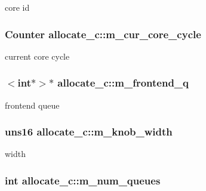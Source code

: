 \label{classallocate__c_a15027f8e994b1f1a92ced957c0e0d3a0}
core id \hypertarget{classallocate__c_af3cea72a28891dbd8f73705382225902}{
\subsubsection[{m\_\-cur\_\-core\_\-cycle}]{\setlength{\rightskip}{0pt plus 5cm}Counter {\bf allocate\_\-c::m\_\-cur\_\-core\_\-cycle}}}
\label{classallocate__c_af3cea72a28891dbd8f73705382225902}
current core cycle \hypertarget{classallocate__c_aff86488af7f8c8c0b95362604f0bf2dd}{
\subsubsection[{m\_\-frontend\_\-q}]{$<$int$\ast$$>$$\ast$ {\bf allocate\_\-c::m\_\-frontend\_\-q}}}
\label{classallocate__c_aff86488af7f8c8c0b95362604f0bf2dd}
frontend queue \hypertarget{classallocate__c_ab40f52d71ffb1e048285b43d8c6c7ac7}{
\subsubsection[{m\_\-knob\_\-width}]{\setlength{\rightskip}{0pt plus 5cm}uns16 {\bf allocate\_\-c::m\_\-knob\_\-width}}}
\label{classallocate__c_ab40f52d71ffb1e048285b43d8c6c7ac7}
width \hypertarget{classallocate__c_adae0a88e65e155bda9ab14a7d5e31407}{
\subsubsection[{m\_\-num\_\-queues}]{\setlength{\rightskip}{0pt plus 5cm}int {\bf allocate\_\-c::m\_\-num\_\-queues}}}
